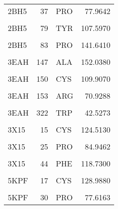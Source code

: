 \begin{table}
\begin{tabular}{lrlr}
			2BH5 & 37 & PRO & 77.9642\\
			\cellcolor{gray!6}{2BH5} & \cellcolor{gray!6}{39} & \cellcolor{gray!6}{LEU} & \cellcolor{gray!6}{123.5750}\\
			\addlinespace
			2BH5 & 79 & TYR & 107.5970\\
			\cellcolor{gray!6}{2BH5} & \cellcolor{gray!6}{80} & \cellcolor{gray!6}{VAL} & \cellcolor{gray!6}{86.0062}\\
			2BH5 & 83 & PRO & 141.6410\\
			\cellcolor{gray!6}{3EAH} & \cellcolor{gray!6}{144} & \cellcolor{gray!6}{TRP} & \cellcolor{gray!6}{91.6868}\\
			3EAH & 147 & ALA & 152.0380\\
			\addlinespace
			\cellcolor{gray!6}{3EAH} & \cellcolor{gray!6}{149} & \cellcolor{gray!6}{ARG} & \cellcolor{gray!6}{75.1674}\\
			3EAH & 150 & CYS & 109.9070\\
			\cellcolor{gray!6}{3EAH} & \cellcolor{gray!6}{151} & \cellcolor{gray!6}{VAL} & \cellcolor{gray!6}{58.7518}\\
			3EAH & 153 & ARG & 70.9288\\
			\cellcolor{gray!6}{3EAH} & \cellcolor{gray!6}{319} & \cellcolor{gray!6}{PHE} & \cellcolor{gray!6}{117.8130}\\
			\addlinespace
			3EAH & 322 & TRP & 42.5273\\
			\cellcolor{gray!6}{3X15} & \cellcolor{gray!6}{12} & \cellcolor{gray!6}{CYS} & \cellcolor{gray!6}{87.5164}\\
			3X15 & 15 & CYS & 124.5130\\
			\cellcolor{gray!6}{3X15} & \cellcolor{gray!6}{16} & \cellcolor{gray!6}{HIS} & \cellcolor{gray!6}{123.2520}\\
			3X15 & 25 & PRO & 84.9462\\
			\addlinespace
			\cellcolor{gray!6}{3X15} & \cellcolor{gray!6}{30} & \cellcolor{gray!6}{ILE} & \cellcolor{gray!6}{143.9220}\\
			3X15 & 44 & PHE & 118.7300\\
			\cellcolor{gray!6}{5KPF} & \cellcolor{gray!6}{14} & \cellcolor{gray!6}{CYS} & \cellcolor{gray!6}{91.6899}\\
			5KPF & 17 & CYS & 128.9880\\
			\cellcolor{gray!6}{5KPF} & \cellcolor{gray!6}{18} & \cellcolor{gray!6}{HIS} & \cellcolor{gray!6}{121.8690}\\
			\addlinespace
			5KPF & 30 & PRO & 77.6163\\

\end{tabular}
\end{table}
